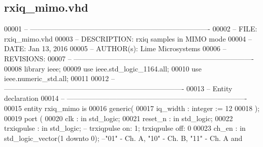\subsection{rxiq\+\_\+mimo.\+vhd}
\label{rxiq__mimo_8vhd_source}

\begin{DoxyCode}
00001 \textcolor{keyword}{-- ---------------------------------------------------------------------------- }
00002 \textcolor{keyword}{-- FILE:    rxiq\_mimo.vhd}
00003 \textcolor{keyword}{-- DESCRIPTION: rxiq samples in MIMO mode}
00004 \textcolor{keyword}{-- DATE:    Jan 13, 2016}
00005 \textcolor{keyword}{-- AUTHOR(s):   Lime Microsystems}
00006 \textcolor{keyword}{-- REVISIONS:}
00007 \textcolor{keyword}{-- ---------------------------------------------------------------------------- }
00008 \textcolor{vhdlkeyword}{library }\textcolor{keywordflow}{ieee};
00009 \textcolor{vhdlkeyword}{use }ieee.std\_logic\_1164.\textcolor{keywordflow}{all};
00010 \textcolor{vhdlkeyword}{use }ieee.numeric\_std.\textcolor{keywordflow}{all};
00011 
00012 \textcolor{keyword}{-- ----------------------------------------------------------------------------}
00013 \textcolor{keyword}{-- Entity declaration}
00014 \textcolor{keyword}{-- ----------------------------------------------------------------------------}
00015 \textcolor{keywordflow}{entity }rxiq_mimo \textcolor{keywordflow}{is}
00016    \textcolor{keywordflow}{generic}\textcolor{vhdlchar}{(}
00017       \textcolor{vhdlchar}{iq_width}      \textcolor{vhdlchar}{:} \textcolor{comment}{integer} \textcolor{vhdlchar}{:=} \textcolor{vhdllogic}{}\textcolor{vhdllogic}{12}
00018    \textcolor{vhdlchar}{)};
00019   \textcolor{keywordflow}{port} \textcolor{vhdlchar}{(}
00020       \textcolor{vhdlchar}{clk}         \textcolor{vhdlchar}{:} \textcolor{keywordflow}{in} \textcolor{comment}{std\_logic};
00021       \textcolor{vhdlchar}{reset_n}     \textcolor{vhdlchar}{:} \textcolor{keywordflow}{in} \textcolor{comment}{std\_logic};
00022       \textcolor{vhdlchar}{trxiqpulse}    \textcolor{vhdlchar}{:} \textcolor{keywordflow}{in} \textcolor{comment}{std\_logic};\textcolor{keyword}{ -- trxiqpulse on: 1; trxiqpulse off: 0}
00023         \textcolor{vhdlchar}{ch_en}           \textcolor{vhdlchar}{:} \textcolor{keywordflow}{in} \textcolor{comment}{std\_logic\_vector}\textcolor{vhdlchar}{(}\textcolor{vhdllogic}{}\textcolor{vhdllogic}{1} \textcolor{keywordflow}{downto} \textcolor{vhdllogic}{}\textcolor{vhdllogic}{0}\textcolor{vhdlchar}{)};\textcolor{keyword}{ --"01" - Ch. A, "10" - Ch. B, "11" - Ch. A and
}
\end{DoxyCode}

